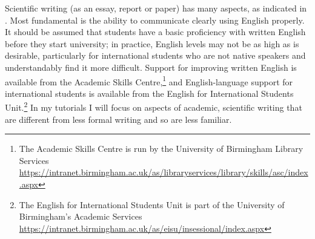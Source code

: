 Scientific writing (as an essay, report or paper) has many aspects, as indicated in . Most fundamental is the ability to communicate clearly using English properly. It should be assumed that students have a basic proficiency with written English before they start university; in practice, English levels may not be as high as is desirable, particularly for international students who are not native speakers and understandably find it more difficult. Support for improving written English is available from the Academic Skills Centre,\footnote{The Academic Skills Centre is run by the University of Birmingham Library Services \url{https://intranet.birmingham.ac.uk/as/libraryservices/library/skills/asc/index.aspx}} and English-language support for international students is available from the English for International Students Unit.\footnote{The English for International Students Unit is part of the University of Birmingham's Academic Services \url{https://intranet.birmingham.ac.uk/as/eisu/insessional/index.aspx}} In my tutorials I will focus on aspects of academic, scientific writing that are different from less formal writing and so are less familiar.

